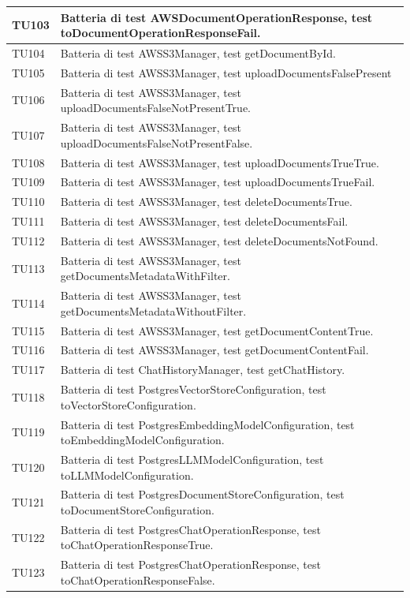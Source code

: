 \documentclass[10pt, a4paper]{article}
\begin{document}
\begin{xltabular}{\textwidth}{p{0.12\textwidth}|X}
\hline
TU103 & Batteria di test AWSDocumentOperationResponse, test toDocumentOperationResponseFail. \\
\hline
TU104 & Batteria di test AWSS3Manager, test getDocumentById. \\
\hline
TU105 & Batteria di test AWSS3Manager, test uploadDocumentsFalsePresent\\
\hline
TU106 & Batteria di test AWSS3Manager, test uploadDocumentsFalseNotPresentTrue. \\
\hline
TU107 & Batteria di test AWSS3Manager, test uploadDocumentsFalseNotPresentFalse. \\
\hline
TU108 & Batteria di test AWSS3Manager, test uploadDocumentsTrueTrue. \\
\hline
TU109 & Batteria di test AWSS3Manager, test uploadDocumentsTrueFail. \\
\hline
TU110 & Batteria di test AWSS3Manager, test deleteDocumentsTrue. \\
\hline
TU111 & Batteria di test AWSS3Manager, test deleteDocumentsFail. \\
\hline
TU112 & Batteria di test AWSS3Manager, test deleteDocumentsNotFound. \\
\hline
TU113 & Batteria di test AWSS3Manager, test getDocumentsMetadataWithFilter. \\
\hline
TU114 & Batteria di test AWSS3Manager, test getDocumentsMetadataWithoutFilter. \\
\hline
TU115 & Batteria di test AWSS3Manager, test getDocumentContentTrue. \\
\hline
TU116 & Batteria di test AWSS3Manager, test getDocumentContentFail. \\
\hline
TU117 & Batteria di test ChatHistoryManager, test getChatHistory. \\
\hline
TU118 & Batteria di test PostgresVectorStoreConfiguration, test toVectorStoreConfiguration. \\
\hline
TU119 & Batteria di test PostgresEmbeddingModelConfiguration, test toEmbeddingModelConfiguration. \\
\hline
TU120 & Batteria di test PostgresLLMModelConfiguration, test toLLMModelConfiguration. \\
\hline
TU121 & Batteria di test PostgresDocumentStoreConfiguration, test toDocumentStoreConfiguration. \\
\hline
TU122 & Batteria di test PostgresChatOperationResponse, test toChatOperationResponseTrue. \\
\hline
TU123 & Batteria di test PostgresChatOperationResponse, test toChatOperationResponseFalse. \\

\end{xltabular}
\end{document}
